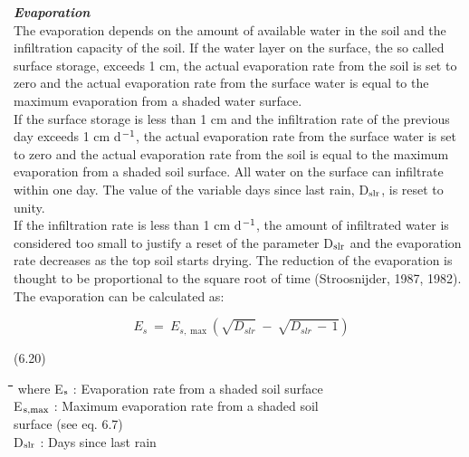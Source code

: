 \documentclass[11pt]{article}
\begin{document}
\bigskip
\bigskip
{\it {\bf Evaporation}\/}\\
The evaporation depends on the amount of available water in the soil and the infiltration
capacity of the soil. If the water layer on the surface, the so called surface storage, 
exceeds 1 cm, the actual {\nobreak}evaporation rate from the soil is set to zero and the actual
evaporation rate from the surface water is equal to the maximum evaporation from a
shaded water surface.\\
If the surface storage is less than 1 cm and the infiltration rate of the previous day
exceeds 1 cm d$^{{\rm -1}}$, the actual evaporation rate from the surface water is set to zero and the
actual evaporation rate from the soil is equal to the maximum evaporation from a shaded
soil surface. All water on the surface can infiltrate within one day. The value of the
variable days since last rain, D$_{{\rm slr}}$, is reset to unity.\\
If the infiltration rate is less than 1 cm d$^{{\rm -1}}$, the amount of infiltrated water is consid\-ered
too small to justify a reset of the parameter D$_{{\rm slr}}$ and the evaporation rate decreases as the
top soil starts drying. The reduction of the evaporation is thought to be proportional to the
square root of time (Stroosnijder, 1987, 1982). The evaporation can be calculated as:

\begin{displaymath}
E _{s} ~=~ E _{s,\max } ( \sqrt{D _{slr} } ~-~ \sqrt{D _{slr} \, -\, 1} )
\end{displaymath}

 \bigskip
\strut\hfill (6.20)
\nwln
\begin{tabbing}
\hspace{1.27cm}\=\hspace{1.27cm}\=\hspace{1.27cm}\=\hspace{1.27cm}\=%
\hspace{1.27cm}\=\hspace{1.27cm}\=\hspace{1.27cm}\=\hspace{1.27cm}\=%
\hspace{1.27cm}\=\hspace{1.27cm}\=\kill
where\> E$_{{\rm s}}$\> : Evaporation rate from a shaded soil surface\> \> \> \> \> \> \> \> [cm d$^{{\rm -1}}$]\\
\>E$_{{\rm s,max}}$\> : Maximum evaporation rate from a shaded soil\\
\>\>   surface (see eq. 6.7)\> \> \> \> \> \> \> \> [cm d$^{{\rm -1}}$]\\
\>D$_{{\rm slr}}$\> : Days since last rain\> \> \> \> \> \> \> \> [d]
\end{tabbing}
\end{document}
